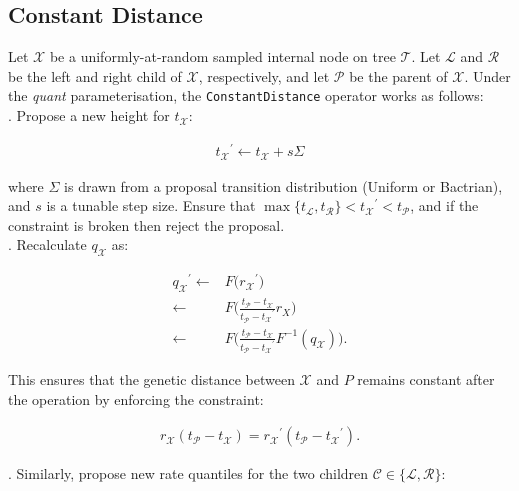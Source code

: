\documentclass[12pt]{article}
\begin{document}
\subsection*{Constant Distance}



Let $\mathcal{X}$ be a uniformly-at-random sampled internal node on tree $\mathcal{T}$. Let $\mathcal{L}$ and $\mathcal{R}$ be the left and right child of $\mathcal{X}$, respectively, and let $\mathcal{P}$ be the parent of $\mathcal{X}$. 
Under the \textit{quant} parameterisation, the \texttt{ConstantDistance} operator works as follows: \\


. Propose a new height for $t_\mathcal{X}$:

\begin{align}
	{t_\mathcal{X}}^\prime \leftarrow t_\mathcal{X} + s\Sigma
\end{align}

where $\Sigma$ is drawn from a proposal transition distribution (Uniform or Bactrian), and $s$ is a tunable step size. Ensure that $\max\{t_\mathcal{L}, t_\mathcal{R} \} < {t_\mathcal{X}}^\prime < t_\mathcal{P}$, and if the constraint is broken then reject the proposal.  \\


. Recalculate $q_\mathcal{X}$ as:



\begin{align}
	{q_\mathcal{X}}^\prime  \leftarrow & F\Big({r_\mathcal{X}}^\prime \Big) \nonumber\\
				\leftarrow & F\Big(\frac{t_\mathcal{P} - t_\mathcal{X}}{t_\mathcal{P} - {t_\mathcal{X}}^\prime} r_X \Big)\nonumber \\
				\leftarrow & F\Big(\frac{t_\mathcal{P} - t_\mathcal{X}}{t_\mathcal{P} - {t_\mathcal{X}}^\prime} F^{-1}(q_\mathcal{X}) \Big).
\end{align}


This ensures that the genetic distance between $\mathcal{X}$ and $P$ remains constant after the operation by enforcing the constraint:


\begin{align}
	r_\mathcal{X} (t_\mathcal{P} - t_\mathcal{X}) = {r_\mathcal{X}}^\prime (t_\mathcal{P} - {t_\mathcal{X}}^\prime).
\end{align}




. Similarly, propose new rate quantiles for the two children $\mathcal{C} \in \{\mathcal{L}, \mathcal{R}\}$:
\end{document}
